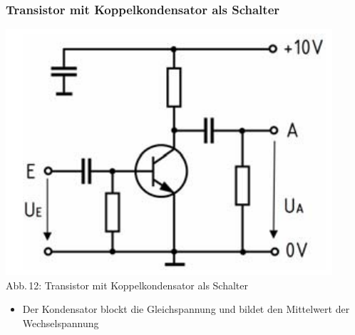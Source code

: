 \begin{frame}
  \frametitle{Transistor mit Koppelkondensator als Schalter}
  \begin{minipage}{0.4\textwidth}
    \begin{center}
      \includegraphics[width=\textwidth,height=.85\textheight,keepaspectratio]{a06/Transistor-Schalter+C.png}\\
      {\tiny Abb.\,12: Transistor mit Koppelkondensator als Schalter~\cite{bnetza}}
    \end{center}
  \end{minipage}
  \hspace{3mm}
  \begin{minipage}{0.5\textwidth}
    \begin{itemize}
      \item Der Kondensator blockt die Gleichspannung und bildet den Mittelwert der Wechselspannung
    \end{itemize}
  \end{minipage}
\end{frame}

